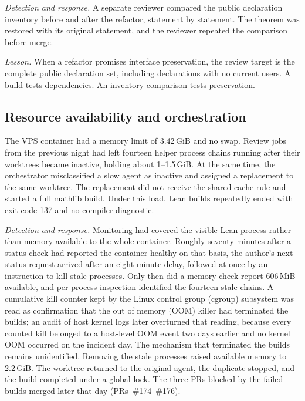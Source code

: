 \emph{Detection and response.}
A separate reviewer compared the public declaration inventory before and
after the refactor, statement by statement. The theorem was restored with
its original statement, and the reviewer repeated the comparison before
merge. %

\emph{Lesson.}
When a refactor promises interface preservation, the review target is the
complete public declaration set, including declarations with no current
users. A build tests dependencies. An inventory comparison tests
preservation. %

\subsection{Resource availability and orchestration}\label{sec:inc005}

The VPS container had a memory limit of 3.42\,GiB and no swap. Review
jobs from the previous night had left fourteen helper process chains
running after their worktrees became inactive, holding about
1--1.5\,GiB. At the same time, the orchestrator misclassified a slow agent
as inactive and assigned a replacement to the same worktree. The
replacement did not receive the shared cache rule and started a full
mathlib build. Under this load, Lean builds repeatedly ended with exit
code 137 and no compiler diagnostic. %

\emph{Detection and response.}
Monitoring had covered the visible Lean process rather than memory
available to the whole container. Roughly seventy minutes after a status
check had reported the container healthy on that basis, the author's next
status request arrived after an eight-minute delay, followed at once by
an instruction to kill stale processes.
Only then did a memory check report 606\,MiB available, and per-process
inspection identified the fourteen stale chains. A
cumulative kill counter kept by the Linux control group (cgroup) subsystem
was read as confirmation that the out of memory (OOM) killer had
terminated the builds; an audit of host kernel logs later overturned that
reading, because every counted kill belonged to a host-level OOM event
two days earlier and no kernel OOM occurred on the incident day. The
mechanism that terminated the builds remains unidentified. Removing the
stale processes raised available memory to 2.2\,GiB. The worktree returned
to the original agent, the duplicate stopped, and the build completed
under a global lock. The three PRs blocked by the failed builds merged
later that day (PRs~\#174--\#176).

